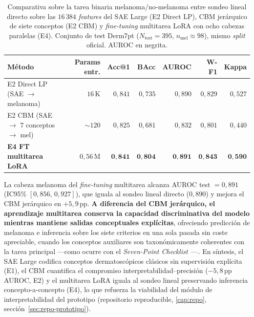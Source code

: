 \begin{table}[htbp]
\centering
\footnotesize
\setlength{\tabcolsep}{4pt}
\renewcommand{\arraystretch}{0.95}
\caption{Comparativa sobre la tarea binaria melanoma/no-melanoma
entre sondeo lineal directo sobre las $16\,384$ \emph{features}
del SAE Large (E2 Direct LP), CBM jerárquico de siete conceptos
(E2 CBM) y \emph{fine-tuning} multitarea LoRA con ocho cabezas
paralelas (E4). Conjunto de test Derm7pt
($N_{\mathrm{test}} = 395$, $n_{\mathrm{mel}} \approx 98$), mismo
\emph{split} oficial. AUROC en negrita.}
\label{tab:sae-d7pt-e4-comp}
\begin{tabular}{lrrrrrr}
\hline
Método                                       & Params entr. & Acc@1     & BAcc      & AUROC              & W-F1      & Kappa     \\
\hline
E2 Direct LP (SAE $\to$ melanoma)             & $16$\,K       & $0{,}841$ & $0{,}735$ & $0{,}890$          & $0{,}829$ & $0{,}527$ \\
E2 CBM (SAE $\to$ $7$ conceptos $\to$ mel)    & $\sim 120$    & $0{,}825$ & $0{,}681$ & $0{,}832$          & $0{,}801$ & $0{,}440$ \\
\textbf{E4 FT multitarea LoRA}                & $0{,}56$\,M   & $\mathbf{0{,}841}$ & $\mathbf{0{,}804}$ & $\mathbf{0{,}891}$ & $\mathbf{0{,}843}$ & $\mathbf{0{,}590}$ \\
\hline
\end{tabular}
\end{table}

La cabeza melanoma del \emph{fine-tuning} multitarea alcanza AUROC test
$= 0{,}891$ (IC95\% $[0{,}856,\,0{,}927]$), que iguala al sondeo lineal
directo ($0{,}890$) y mejora el CBM jerárquico en $+5{,}9$\,pp.
\textbf{A diferencia del CBM jerárquico, el aprendizaje multitarea
conserva la capacidad discriminativa del modelo mientras mantiene
salidas conceptuales explícitas}, ofreciendo predicción de melanoma e
inferencia sobre los siete criterios en una sola pasada sin coste
apreciable, cuando los conceptos auxiliares son taxonómicamente
coherentes con la tarea principal ---como ocurre con el \emph{Seven-Point
Checklist}~\cite{kawahara2019}---. En síntesis, el SAE Large codifica
conceptos dermatoscópicos clásicos sin supervisión explícita (E1), el
CBM cuantifica el compromiso interpretabilidad--precisión ($-5{,}8$\,pp
AUROC, E2) y el multitarea LoRA iguala al sondeo lineal preservando
inferencia concepto-a-concepto (E4), lo que refuerza la viabilidad del
módulo de interpretabilidad del prototipo (repositorio reproducible,
\ref{cap:repo}, sección~\ref{sec:repo-prototipo}).

